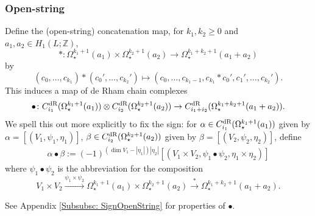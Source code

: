 \documentclass[10pt]{amsart}
\numberwithin{equation}{section}
\theoremstyle{plain}
\theoremstyle{definition}
\theoremstyle{remark}
\numberwithin{equation}{section}
\newcommand{\Z}{\mathbb{Z}}
\newcommand{\dR}{\textup{dR}}
\begin{document}
{\subsubsection{Open-string}
Define the (open-string) concatenation map, for $k_1,k_2\geq 0$ and $a_1,a_2\in H_1(L;\Z)$,
\[
	*\colon \Omega^{k_1+1}_\star (a_1)\times \Omega^{k_2+1}_\star (a_2)\to \Omega^{k_1+k_2+1}_\star (a_1+a_2)
\]
by
\[
	(c_0,\dots, c_{k_1}) * (c_0',\dots, c_{k_2}')\mapsto (c_0,\dots, c_{k_1-1}, c_{k_1}*c_{0}', c_1', \dots, c_{k_2}').
\]
This induces a map of de Rham chain complexes
\[
	\bullet\colon  C_{i_1}^\dR(\Omega^{k_1+1}_\star(a_1))\otimes C_{i_2}^\dR(\Omega_\star^{k_2+1}(a_2))\to C_{i_1+i_2}^\dR(\Omega_\star^{k_1+k_2+1}(a_1+a_2)).
\]
We spell this out more explicitly to fix the sign: for $\alpha\in C_{i_1}^\dR(\Omega^{k_1+1}_\star(a_1))$ given by $\alpha=[(V_1,\psi_1,\eta_1)]$, $\beta\in C^\dR_{i_2}(\Omega_\star^{k_2+1}(a_2))$ given by $\beta = [(V_2,\psi_2,\eta_2)]$, define
\begin{align}\label{Eq: PartialPontryagin}
	\alpha \bullet\beta := (-1)^{(\dim V_1- |\eta_1|)|\eta_2|}[(V_1\times V_2, \psi_1\bullet \psi_2, \eta_1\times \eta_2)]
\end{align}
where $\psi_1\bullet\psi_2$ is the abbreviation for the composition
\[
	V_1\times V_2 \xrightarrow{\psi_1\times \psi_2} \Omega^{k_1+1}_\star(a_1)\times \Omega_\star^{k_2+1}(a_2)\xrightarrow{*} \Omega_\star^{k_1+k_2+1}(a_1+a_2).
\]

See Appendix \ref{Subsubsc: SignOpenString} for properties of $\bullet$.

}
\end{document}
